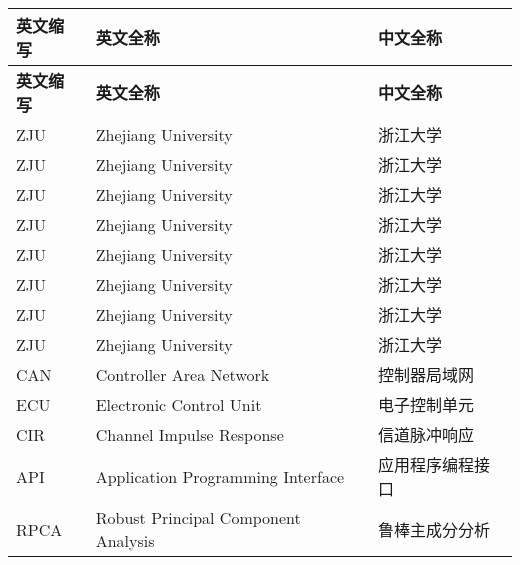 \cleardoublepage
{}
\begin{center}
    \begin{longtable}{m{2cm}m{8cm}m{5cm}}
        \toprule
        \textbf{英文缩写}&\textbf{英文全称}&\textbf{中文全称}\\
        \midrule
        \endfirsthead
        \toprule
        \textbf{英文缩写}&\textbf{英文全称}&\textbf{中文全称}\\
        \midrule
        \endhead 
        \bottomrule
        \endfoot
        \bottomrule
        \endlastfoot
        ZJU&Zhejiang University&浙江大学\\
        ZJU&Zhejiang University&浙江大学\\
        ZJU&Zhejiang University&浙江大学\\
        ZJU&Zhejiang University&浙江大学\\
        ZJU&Zhejiang University&浙江大学\\
        ZJU&Zhejiang University&浙江大学\\
        ZJU&Zhejiang University&浙江大学\\
        ZJU&Zhejiang University&浙江大学\\
        CAN&Controller Area Network&控制器局域网\\
        ECU&Electronic Control Unit&电子控制单元\\
        CIR&Channel Impulse Response&信道脉冲响应\\
        API&Application Programming Interface&应用程序编程接口\\
        RPCA&Robust Principal Component Analysis&鲁棒主成分分析\\
	\end{longtable}
\end{center}